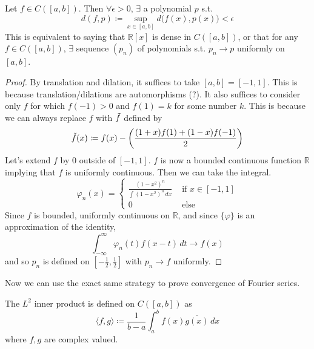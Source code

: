   \begin{theorem}
    Let $f \in C([a, b])$. Then $\forall \epsilon > 0$, $\exists$ a polynomial $p$ s.t. 
    \begin{equation}
      d(f, p) \coloneqq \sup_{x \in [a, b]} d\big( f(x), p(x) ) < \epsilon
    \end{equation}
    This is equivalent to saying that $\mathbb{R}[x]$ is dense in $C([a, b])$, or that for any $f \in C([a, b])$, $\exists$ sequence $(p_n)$ of polynomials s.t. $p_n \to p$ uniformly on $[a, b]$. 
  \end{theorem}
  \begin{proof}
    By translation and dilation, it suffices to take $[a, b] = [-1, 1]$. This is because translation/dilations are automorphisms (?). It also suffices to consider only $f$ for which $f(-1) > 0$ and $f(1) = k$ for some number $k$. This is because we can always replace $f$ with $\Tilde{f}$ defined by 
    \begin{equation}
      \Tilde{f}(x) \coloneqq f(x) - \bigg( \frac{(1 + x) f(1) + (1 - x)f(-1)}{2} \bigg)
    \end{equation} 
    Let's extend $f$ by $0$ outside of $[-1, 1]$. $f$ is now a bounded continuous function $\mathbb{R}$ implying that $f$ is uniformly continuous. Then we can take the integral. 
    \begin{equation}
      \varphi_n (x) = \begin{cases} 
        \frac{(1 - x^2)^n}{\int (1 - x^2)^n \,dx} & \text{ if } x \in [-1, 1] \\ 
        0 & \text{ else} 
      \end{cases} 
    \end{equation}
    Since $f$ is bounded, uniformly continuous on $\mathbb{R}$, and since $\{\varphi\}$ is an approximation of the identity, 
    \begin{equation}
      \int_{-\infty}^\infty \varphi_n (t) f(x - t) \,dt \to f(x)
    \end{equation} 
    and so $p_n$ is defined on $[-\frac{1}{2}, \frac{1}{2}]$ with $p_n \to f$ uniformly. 
  \end{proof}

  Now we can use the exact same strategy to prove convergence of Fourier series. 

  \begin{definition}
    The $L^2$ inner product is defined on $C([a, b])$ as 
    \begin{equation}
      \langle f, g \rangle \coloneqq \frac{1}{b - a} \int_a^b f(x) \overline{g(x)} \,dx 
    \end{equation}
    where $f, g$ are complex valued. 
  \end{definition}

